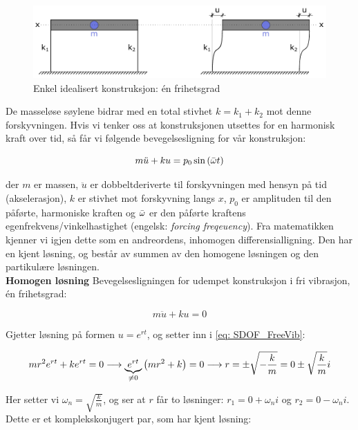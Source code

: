 \begin{figure}[h]
    \centering
    \includegraphics[width=\linewidth]{0 FIGURER/SDOF.pdf}
    \caption{Enkel idealisert konstruksjon: én frihetsgrad}
    \label{fig:Enkel idealisert konstruksjon: én frihetsgrad}
\end{figure}

De masseløse søylene bidrar med en total stivhet $k = k_1 + k_2$ mot denne forskyvningen. Hvis vi tenker oss at konstruksjonen utsettes for en harmonisk kraft over tid, så får vi følgende bevegelsesligning for vår konstruksjon: 

\begin{equation}
    m \ddot{u} + ku = p_0 \sin \left({\Bar{\omega} t}\right)
\end{equation}

der $m$ er massen, $\ddot{u}$ er dobbeltderiverte til forskyvningen med hensyn på tid (akselerasjon), $k$ er stivhet mot forskyvning langs $x$, $p_0$ er amplituden til den påførte, harmoniske kraften og $\Bar{\omega}$ er den påførte kraftens egenfrekvens/vinkelhastighet (engelsk: \emph{forcing freqeuency}). Fra matematikken kjenner vi igjen dette som en andreordens, inhomogen differensialligning. Den har en kjent løsning, og består av summen av den homogene løsningen og den partikulære løsningen. \\

\textbf{Homogen løsning
} \quad Bevegelsesligningen for udempet konstruksjon i fri vibrasjon, én frihetsgrad:

\begin{equation} \label{eq: SDOF_FreeVib}
    m \ddot{u} + ku  = 0 
\end{equation}

Gjetter løsning på formen $u = e^{rt}$, og setter inn i \eqref{eq: SDOF_FreeVib}: 

\begin{equation}
    mr^2e^{rt} + ke^{rt} = 0 \longrightarrow  \underbrace{e^{rt}}_{\neq 0} \left({mr^2 + k}\right) = 0 \longrightarrow r = \pm \sqrt{-\frac{k}{m}} = 0 \pm \sqrt{\frac{k}{m}}i
\end{equation}

Her setter vi $\omega_n = \sqrt{\frac{k}{m}}$, og ser at $r$ får to løsninger: $r_1 = 0 + \omega_n i$ og $r_2 = 0 - \omega_n i$. Dette er et komplekskonjugert par, som har kjent løsning:

